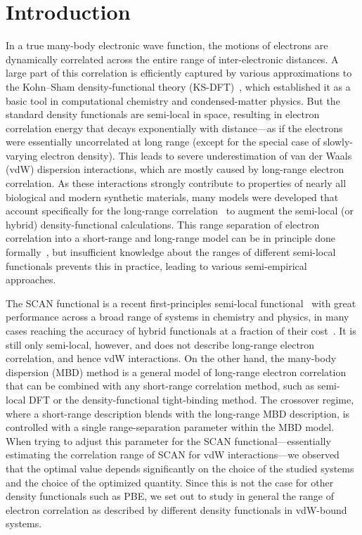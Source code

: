 \section{Introduction}

In a true many-body electronic wave function, the motions of electrons are dynamically correlated across the entire range of inter-electronic distances.
A large part of this correlation is efficiently captured by various approximations to the Kohn--Sham density-functional theory (KS-DFT)~\cite{KohnPR65}, which established it as a basic tool in computational chemistry and condensed-matter physics.
But the standard density functionals are semi-local in space, resulting in electron correlation energy that decays exponentially with distance---as if the electrons were essentially uncorrelated at long range (except for the special case of slowly-varying electron density).
This leads to severe underestimation of van der Waals (vdW) dispersion interactions, which are mostly caused by long-range electron correlation.
As these interactions strongly contribute to properties of nearly all biological and modern synthetic materials, many models were developed that account specifically for the long-range correlation~\cite{DionPRL04,VydrovJCP10a,JohnsonJCP06,TkatchenkoPRL09,GrimmeJCP10,AmbrosettiJCP14} to augment the semi-local (or hybrid) density-functional calculations.
This range separation of electron correlation into a short-range and long-range model can be in principle done formally~\cite{HermannCR17}, but insufficient knowledge about the ranges of different semi-local functionals prevents this in practice, leading to various semi-empirical approaches.

The SCAN functional is a recent first-principles semi-local functional~\cite{SunPRL15} with great performance across a broad range of systems in chemistry and physics, in many cases reaching the accuracy of hybrid functionals at a fraction of their cost~\cite{SunNC16}.
It is still only semi-local, however, and does not describe long-range electron correlation, and hence vdW interactions.
On the other hand, the many-body dispersion (MBD) method is a general model of long-range electron correlation~\cite{TkatchenkoPRL12,AmbrosettiJCP14} that can be combined with any short-range correlation method, such as semi-local DFT or the density-functional tight-binding method.
The crossover regime, where a short-range description blends with the long-range MBD description, is controlled with a single range-separation parameter within the MBD model.
When trying to adjust this parameter for the SCAN functional---essentially estimating the correlation range of SCAN for vdW interactions---we observed that the optimal value depends significantly on the choice of the studied systems and the choice of the optimized quantity.
Since this is not the case for other density functionals such as PBE, we set out to study in general the range of electron correlation as described by different density functionals in vdW-bound systems.

